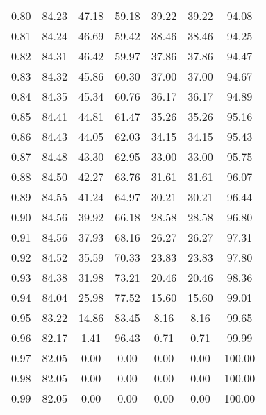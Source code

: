 \begin{tabular}{|c|c|c|c|c|c|c|}
      0.80 &     84.23 &     47.18 &      59.18 &   39.22 &      39.22 &         94.08 \\
      0.81 &     84.24 &     46.69 &      59.42 &   38.46 &      38.46 &         94.25 \\
      0.82 &     84.31 &     46.42 &      59.97 &   37.86 &      37.86 &         94.47 \\
      0.83 &     84.32 &     45.86 &      60.30 &   37.00 &      37.00 &         94.67 \\
      0.84 &     84.35 &     45.34 &      60.76 &   36.17 &      36.17 &         94.89 \\
      0.85 &     84.41 &     44.81 &      61.47 &   35.26 &      35.26 &         95.16 \\
      0.86 &     84.43 &     44.05 &      62.03 &   34.15 &      34.15 &         95.43 \\
      0.87 &     84.48 &     43.30 &      62.95 &   33.00 &      33.00 &         95.75 \\
      0.88 &     84.50 &     42.27 &      63.76 &   31.61 &      31.61 &         96.07 \\
      0.89 &     84.55 &     41.24 &      64.97 &   30.21 &      30.21 &         96.44 \\
      0.90 &     84.56 &     39.92 &      66.18 &   28.58 &      28.58 &         96.80 \\
      0.91 &     84.56 &     37.93 &      68.16 &   26.27 &      26.27 &         97.31 \\
      0.92 &     84.52 &     35.59 &      70.33 &   23.83 &      23.83 &         97.80 \\
      0.93 &     84.38 &     31.98 &      73.21 &   20.46 &      20.46 &         98.36 \\
      0.94 &     84.04 &     25.98 &      77.52 &   15.60 &      15.60 &         99.01 \\
      0.95 &     83.22 &     14.86 &      83.45 &    8.16 &       8.16 &         99.65 \\
      0.96 &     82.17 &      1.41 &      96.43 &    0.71 &       0.71 &         99.99 \\
      0.97 &     82.05 &      0.00 &       0.00 &    0.00 &       0.00 &        100.00 \\
      0.98 &     82.05 &      0.00 &       0.00 &    0.00 &       0.00 &        100.00 \\
      0.99 &     82.05 &      0.00 &       0.00 &    0.00 &       0.00 &        100.00 \\
\bottomrule
\end{tabular}
